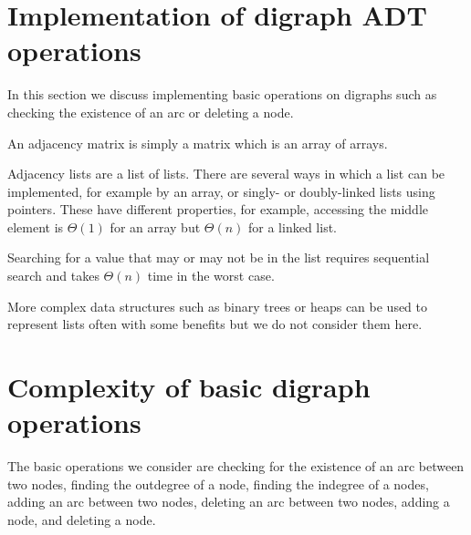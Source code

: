 %
%
%
%
%
%
%

\section{Implementation of digraph ADT operations}
\label{sec:graphadtimpl}

In this section we discuss implementing basic operations on digraphs such as checking the existence of an arc or deleting a node.

An adjacency matrix is simply a matrix which is an array of arrays. 

Adjacency lists are a list of lists. There are several ways in which a list can be implemented, for
example by an array,  or singly- or doubly-linked lists using pointers.  These have different properties, for example, accessing the middle element is $\Theta(1)$ for an array but $\Theta(n)$ for a linked list. 

Searching for a value that may or may not be in the list requires sequential search
and takes $\Theta(n)$ time in the worst case. 

More complex data structures such as binary trees or heaps can be used to represent lists often with some benefits but we do not consider them here. 

\section{Complexity of basic digraph operations}
The basic operations we consider are checking for the existence of an arc between two nodes, finding the outdegree of a node, 
finding the indegree of a nodes, adding an arc between two nodes, deleting an arc between two nodes, adding a node, and deleting a node. 

